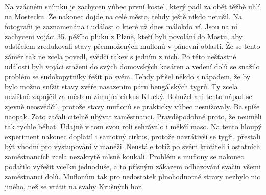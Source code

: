 
Na vzácném snímku je zachycen vůbec první kostel, který padl za oběť
těžbě uhlí na Mostecku. Že nakonec dojde na celé město, tehdy ještě
nikdo netušil. Na fotografii je zaznamenána i událost o které už dnes
málokdo ví. Jsou na ní zachyceni vojáci 35. pěšího pluku z Plzně,
kteří byli povolání do Mostu, aby odstřelem zredukovali stavy
přemnožených muflonů v pánevní oblasti. Že se tento záměr tak ne zcela
povedl, svědčí rakev s jedním z nich. Po této nešťastné události byli
vojáci staženi do svých domovských kasáren a vedení dolů se snažilo
problém se sudokopytníky řešit po svém. Tehdy přišel někdo s nápadem,
že by bylo možno snížit stavy zvěře nasazením páru bengálských tygrů.
Ty zcela nezištně zapůjčil za městem zimující cirkus Klucký. Bohužel
ani tento nápad se zjevně neosvědčil, protože stavy muflonů se
prakticky vůbec nesnižovaly. Ba spíše naopak. Zato začali citelně
ubývat zaměstnanci. Pravděpodobně proto, že neuměli tak rychle běhat.
Údajně v tom svou roli sehrávalo i měkčí maso. Na tento hloupý
experiment nakonec doplatil i samotný cirkus, protože navrátivší se
tygři, přestali být vhodní pro vystupování v manéži. Neustále totiž po
svém krotiteli i ostatních zaměstnancích zcela nezakrytě mlsně
koukali. Problém s muflony se nakonec podařilo vyřešit vcelku
jednoduše, a to přísným zákazem odhazování svačin všemi zaměstnanci
dolů. Muflonům tak pro nedostatek plnohodnotné stravy nezbylo nic
jiného, než se vrátit na svahy Krušných hor.
